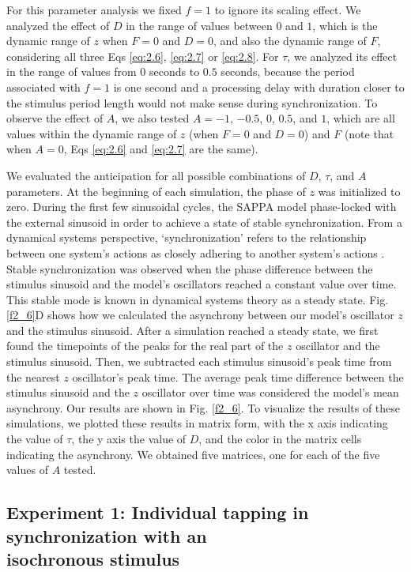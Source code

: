 \documentclass{report}
\begin{document}
For this parameter analysis we fixed $f = 1$ to ignore its scaling effect. We analyzed the effect of $D$ in the range of values between $0$ and $1$, which is the dynamic range of $z$ when $F = 0$ and $D = 0$, and also the dynamic range of $F$, considering all three Eqs \eqref{eq:2.6}, \eqref{eq:2.7} or \eqref{eq:2.8}. For $\tau$, we analyzed its effect in the range of values from $0$ seconds to $0.5$ seconds, because the period associated with $f = 1$ is one second and a processing delay with duration closer to the stimulus period length would not make sense during synchronization. To observe the effect of $A$, we also tested $A = -1$, $-0.5$, $0$, $0.5$, and $1$, which are all values within the dynamic range of $z$ (when $F = 0$ and $D = 0$) and $F$ (note that when $A = 0$, Eqs \eqref{eq:2.6} and \eqref{eq:2.7} are the same).

We evaluated the anticipation for all possible combinations of $D$, $\tau$, and $A$ parameters. At the beginning of each simulation, the phase of $z$ was initialized to zero. During the first few sinusoidal cycles, the SAPPA model phase-locked with the external sinusoid in order to achieve a state of stable synchronization. From a dynamical systems perspective, `synchronization' refers to the relationship between one system's actions as closely adhering to another system's actions \cite{pecora1990synchronization}. Stable synchronization was observed when the phase difference between the stimulus sinusoid and the model's oscillators reached a constant value over time. This stable mode is known in dynamical systems theory as a steady state. Fig.{} \ref{f2_6}D shows how we calculated the asynchrony between our model's oscillator $z$ and the stimulus sinusoid. After a simulation reached a steady state, we first found the timepoints of the peaks for the real part of the $z$ oscillator and the stimulus sinusoid. Then, we subtracted each stimulus sinusoid's peak time from the nearest $z$ oscillator's peak time. The average peak time difference between the stimulus sinusoid and the $z$ oscillator over time was considered the model's mean asynchrony. Our results are shown in Fig.{} \ref{f2_6}. To visualize the results of these simulations, we plotted these results in matrix form, with the x axis indicating the value of $\tau$, the y axis the value of $D$, and the color in the matrix cells indicating the asynchrony. We obtained five matrices, one for each of the five values of $A$ tested.

\subsection{Experiment 1: Individual tapping in synchronization with an \\ isochronous stimulus}
\end{document}
